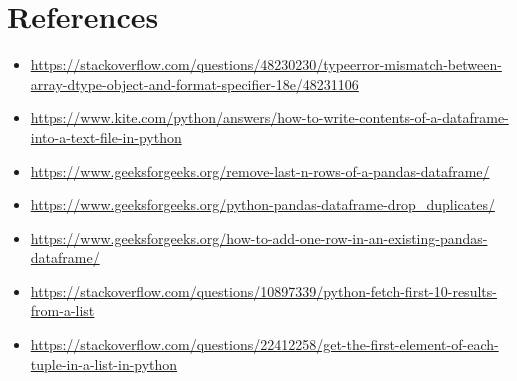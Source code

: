 \documentclass[12pt]{article}
\begin{document}
\section*{References}
\begin{itemize}
    \item {\url{https://stackoverflow.com/questions/48230230/typeerror-mismatch-between-array-dtype-object-and-format-specifier-18e/48231106}}
     \item {\url{https://www.kite.com/python/answers/how-to-write-contents-of-a-dataframe-into-a-text-file-in-python}}
     \item{\url{https://www.geeksforgeeks.org/remove-last-n-rows-of-a-pandas-dataframe/}}
     \item{\url{https://www.geeksforgeeks.org/python-pandas-dataframe-drop_duplicates/}}
     \item{\url{https://www.geeksforgeeks.org/how-to-add-one-row-in-an-existing-pandas-dataframe/}}
     \item{\url{https://stackoverflow.com/questions/10897339/python-fetch-first-10-results-from-a-list}}
     \item{\url{https://stackoverflow.com/questions/22412258/get-the-first-element-of-each-tuple-in-a-list-in-python}}
\end{itemize}
\end{document}
